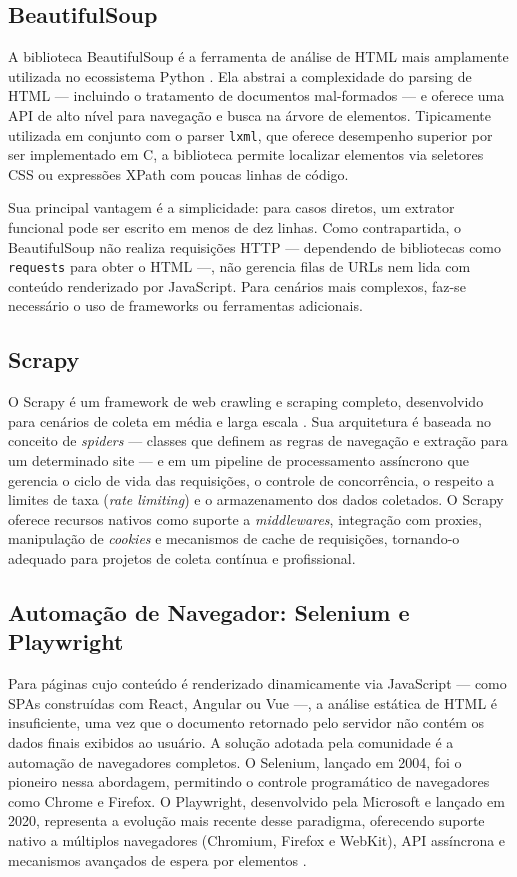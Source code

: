 \documentclass[tcc,capa]{texifsul}
\begin{document}
\subsection*{BeautifulSoup}

A biblioteca BeautifulSoup é a ferramenta de análise de HTML mais amplamente utilizada no ecossistema Python \cite{BeautifulSoup2024}. Ela abstrai a complexidade do parsing de HTML — incluindo o tratamento de documentos mal-formados — e oferece uma API de alto nível para navegação e busca na árvore de elementos. Tipicamente utilizada em conjunto com o parser \texttt{lxml}, que oferece desempenho superior por ser implementado em C, a biblioteca permite localizar elementos via seletores CSS ou expressões XPath com poucas linhas de código.

Sua principal vantagem é a simplicidade: para casos diretos, um extrator funcional pode ser escrito em menos de dez linhas. Como contrapartida, o BeautifulSoup não realiza requisições HTTP — dependendo de bibliotecas como \texttt{requests} para obter o HTML —, não gerencia filas de URLs nem lida com conteúdo renderizado por JavaScript. Para cenários mais complexos, faz-se necessário o uso de frameworks ou ferramentas adicionais.

\subsection*{Scrapy}

O Scrapy é um framework de web crawling e scraping completo, desenvolvido para cenários de coleta em média e larga escala \cite{Scrapy2024}. Sua arquitetura é baseada no conceito de \textit{spiders} — classes que definem as regras de navegação e extração para um determinado site — e em um pipeline de processamento assíncrono que gerencia o ciclo de vida das requisições, o controle de concorrência, o respeito a limites de taxa (\textit{rate limiting}) e o armazenamento dos dados coletados. O Scrapy oferece recursos nativos como suporte a \textit{middlewares}, integração com proxies, manipulação de \textit{cookies} e mecanismos de cache de requisições, tornando-o adequado para projetos de coleta contínua e profissional.

\subsection*{Automação de Navegador: Selenium e Playwright}

Para páginas cujo conteúdo é renderizado dinamicamente via JavaScript — como SPAs construídas com React, Angular ou Vue —, a análise estática de HTML é insuficiente, uma vez que o documento retornado pelo servidor não contém os dados finais exibidos ao usuário. A solução adotada pela comunidade é a automação de navegadores completos. O Selenium, lançado em 2004, foi o pioneiro nessa abordagem, permitindo o controle programático de navegadores como Chrome e Firefox. O Playwright, desenvolvido pela Microsoft e lançado em 2020, representa a evolução mais recente desse paradigma, oferecendo suporte nativo a múltiplos navegadores (Chromium, Firefox e WebKit), API assíncrona e mecanismos avançados de espera por elementos \cite{Playwright2024}.
\end{document}
